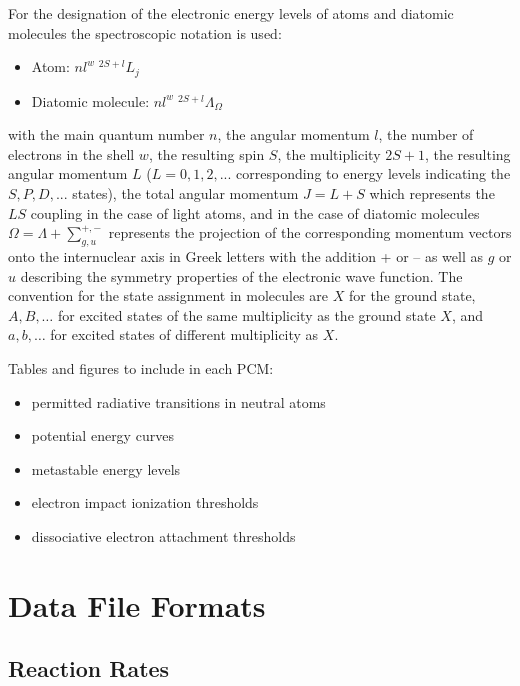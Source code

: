 For the designation of the electronic energy levels of atoms and diatomic
molecules the spectroscopic notation is used:\\

\begin{itemize}
\item Atom: $nl^w\; {}^{2S+l}L_j$\\
\item Diatomic molecule: $nl^w\; {}^{2S+l}\Lambda_\Omega$
\end{itemize}
 
with the main quantum number $n$, the angular momentum $l$, the number of electrons
in the shell $w$, the resulting spin $S$, the multiplicity $2S + 1$, the resulting angular
momentum $L$ ($L = 0, 1, 2,...$ corresponding to energy levels indicating the $S, P, D,. . .$ 
states), the total angular momentum $J = L+S$ which represents the  $LS$ coupling in
the case of light atoms, and in the case of diatomic molecules  $\Omega =\Lambda + \sum_{g,u}^{+,-}$ represents
the projection of the corresponding momentum vectors onto the internuclear axis in
Greek letters with the addition + or – as well as $g$ or $u$ describing the symmetry
properties of the electronic wave function. The convention for the state assignment in
molecules are $X$ for the ground state, $A, B,\ldots$ for excited states of the same multiplicity
as the ground state $X$, and $a, b,\ldots$ for excited states of different multiplicity as $X$.

Tables and figures to include in each PCM:

\begin{itemize}
\item permitted radiative transitions in neutral atoms
\item potential energy curves
\item metastable energy levels
\item electron impact ionization thresholds
\item dissociative electron attachment thresholds
\end{itemize}

\section{Data File Formats}

\subsection{Reaction Rates}


